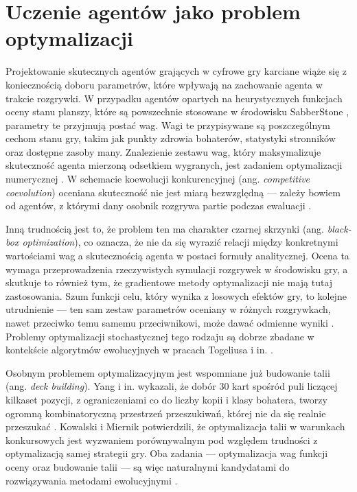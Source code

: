 \section{Uczenie agentów jako problem optymalizacji} \label{sec:agent_optim}

Projektowanie skutecznych agentów grających w cyfrowe gry karciane wiąże się z koniecznością doboru parametrów, które wpływają na zachowanie agenta w trakcie rozgrywki. W przypadku agentów opartych na heurystycznych funkcjach oceny stanu planszy, które są powszechnie stosowane w środowisku SabberStone \cite{hearthstonewiki}, parametry te przyjmują postać wag. Wagi te przypisywane są poszczególnym cechom stanu gry, takim jak punkty zdrowia bohaterów, statystyki stronników oraz dostępne zasoby many. Znalezienie zestawu wag, który maksymalizuje skuteczność agenta mierzoną odsetkiem wygranych, jest zadaniem optymalizacji numerycznej \cite{sanchez2020}. W schemacie koewolucji konkurencyjnej (ang. \textit{competitive coevolution}) oceniana skuteczność nie jest miarą bezwzględną --- zależy bowiem od agentów, z którymi dany osobnik rozgrywa partie podczas ewaluacji \cite{stanley2004}.

Inną trudnością jest to, że problem ten ma charakter czarnej skrzynki (ang. \textit{black-box optimization}), co oznacza, że nie da się wyrazić relacji między konkretnymi wartościami wag a skutecznością agenta w postaci formuły analitycznej. Ocena ta wymaga przeprowadzenia rzeczywistych symulacji rozgrywek w środowisku gry, a skutkuje to również tym, że gradientowe metody optymalizacji nie mają tutaj zastosowania. Szum funkcji celu, który wynika z losowych efektów gry, to kolejne utrudnienie --- ten sam zestaw parametrów oceniany w różnych rozgrywkach, nawet przeciwko temu samemu przeciwnikowi, może dawać odmienne wyniki \cite{hoover2020}. Problemy optymalizacji stochastycznej tego rodzaju są dobrze zbadane w kontekście algorytmów ewolucyjnych w pracach Togeliusa i in. \cite{TogeliusYannakakis2023, TogeliusYannakakis2025}.

Osobnym problemem optymalizacyjnym jest wspomniane już budowanie talii (ang. \textit{deck building}). Yang i in. wykazali, że dobór 30 kart spośród puli liczącej kilkaset pozycji, z ograniczeniami co do liczby kopii i klasy bohatera, tworzy ogromną kombinatoryczną przestrzeń przeszukiwań, której nie da się realnie przeszukać \cite{yang2021}. Kowalski i Miernik \cite{kowalski2023} potwierdzili, że optymalizacja talii w warunkach konkursowych jest wyzwaniem porównywalnym pod względem trudności z optymalizacją samej strategii gry. Oba zadania --- optymalizacja wag funkcji oceny oraz budowanie talii --- są więc naturalnymi kandydatami do rozwiązywania metodami ewolucyjnymi \cite{TogeliusYannakakis2023}.

